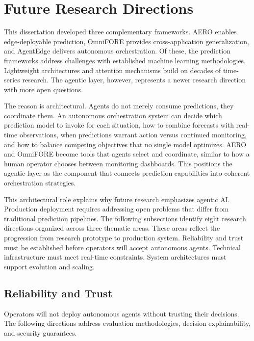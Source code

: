 \section{Future Research Directions}
\label{sec:ch6_future_research}

This dissertation developed three complementary frameworks. \ac{AERO} enables edge-deployable prediction, \ac{OmniFORE} provides cross-application generalization, and \ac{AgentEdge} delivers autonomous orchestration. Of these, the prediction frameworks address challenges with established machine learning methodologies. Lightweight architectures and attention mechanisms build on decades of time-series research. The agentic layer, however, represents a newer research direction with more open questions.

The reason is architectural. Agents do not merely consume predictions, they coordinate them. An autonomous orchestration system can decide which prediction model to invoke for each situation, how to combine forecasts with real-time observations, when predictions warrant action versus continued monitoring, and how to balance competing objectives that no single model optimizes. \ac{AERO} and \ac{OmniFORE} become tools that agents select and coordinate, similar to how a human operator chooses between monitoring dashboards. This positions the agentic layer as the component that connects prediction capabilities into coherent orchestration strategies.

This architectural role explains why future research emphasizes agentic \ac{AI}. Production deployment requires addressing open problems that differ from traditional prediction pipelines. The following subsections identify eight research directions organized across three thematic areas. These areas reflect the progression from research prototype to production system. Reliability and trust must be established before operators will accept autonomous agents. Technical infrastructure must meet real-time constraints. System architectures must support evolution and scaling.

\subsection{Reliability and Trust}
\label{subsec:ch6_reliability_trust}

Operators will not deploy autonomous agents without trusting their decisions. The following directions address evaluation methodologies, decision explainability, and security guarantees.


